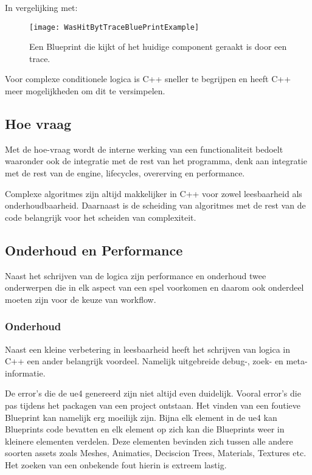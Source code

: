 In vergelijking met:

\begin{figure}[!ht]
  \centering
    \texttt{[image: WasHitBytTraceBluePrintExample]}
    \caption{Een Blueprint die kijkt of het huidige component geraakt is door een trace.}
\end{figure}

Voor complexe conditionele logica is C++ sneller te begrijpen en heeft C++ meer mogelijkheden om dit te versimpelen. 

\subsection{Hoe vraag}
Met de hoe-vraag wordt de interne werking van een functionaliteit bedoelt waaronder ook de integratie met de rest van het programma, denk aan integratie met de rest van de engine, lifecycles, overerving en performance.

Complexe algoritmes zijn altijd makkelijker in C++ voor zowel leesbaarheid als onderhoudbaarheid. Daarnaast is de scheiding van algoritmes met de rest van de code belangrijk voor het scheiden van complexiteit.

\subsection{Onderhoud en Performance}
Naast het schrijven van de logica zijn performance en onderhoud twee onderwerpen die in elk aspect van een spel voorkomen en daarom ook onderdeel moeten zijn voor de keuze van workflow.

\subsubsection{Onderhoud}
Naast een kleine verbetering in leesbaarheid heeft het schrijven van logica in C++ een ander belangrijk voordeel. Namelijk uitgebreide debug-, zoek- en meta-informatie. 

De error’s die de \gls{ue4} genereerd zijn niet altijd even duidelijk. Vooral error’s die pas tijdens het packagen van een project ontstaan. Het vinden van een foutieve Blueprint kan namelijk erg moeilijk zijn. Bijna elk element in de \gls{ue4} kan Blueprints code bevatten en elk element op zich kan die Blueprints weer in kleinere elementen verdelen. Deze elementen bevinden zich tussen alle andere soorten assets zoals Meshes, Animaties, Deciscion Trees, Materials, Textures etc. Het zoeken van een onbekende fout hierin is extreem lastig.

